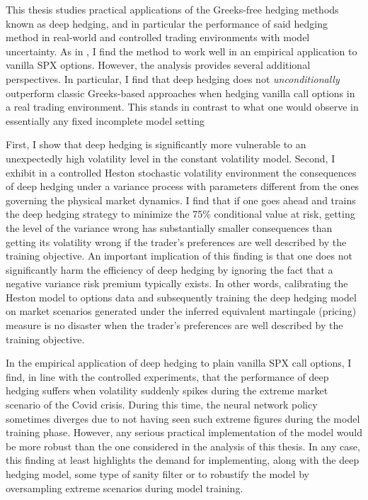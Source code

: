 This thesis studies practical applications of the Greeks-free hedging methods known as deep hedging, and in particular the performance of said hedging method in real-world and controlled trading environments with model uncertainty. As in \cite{buehler2019deep}, I find the method to work well in an empirical application to vanilla SPX options. However, the analysis provides several additional perspectives. In particular, I find that deep hedging does not \emph{unconditionally} outperform classic Greeks-based approaches when hedging vanilla call options in a real trading environment. This stands in contrast to what one would observe in essentially any fixed incomplete model setting 

First, I show that deep hedging is significantly more vulnerable to an unexpectedly high volatility level in the constant volatility model. Second, I exhibit in a controlled Heston stochastic volatility environment the consequences of deep hedging under a variance process with parameters different from the ones governing the physical market dynamics. I find that if one goes ahead and trains the deep hedging strategy to minimize the 75\% conditional value at risk, getting the level of the variance wrong has substantially smaller consequences than getting its volatility wrong if the trader's preferences are well described by the training objective. An important implication of this finding is that one does not significantly harm the efficiency of deep hedging by ignoring the fact that a negative variance risk premium typically exists. In other words, calibrating the Heston model to options data and subsequently training the deep hedging model on market scenarios generated under the inferred equivalent martingale (pricing) measure is no disaster when the trader's preferences are well described by the training objective.%

In the empirical application of deep hedging to plain vanilla SPX call options, I find, in line with the controlled experiments, that the performance of deep hedging suffers when volatility suddenly spikes during the extreme market scenario of the Covid crisis. During this time, the neural network policy sometimes diverges due to not having seen such extreme figures during the model training phase. However, any serious practical implementation of the model would be more robust than the one considered in the analysis of this thesis. In any case, this finding at least highlights the demand for implementing, along with the deep hedging model, some type of sanity filter or to robustify the model by oversampling extreme scenarios during model training. 

